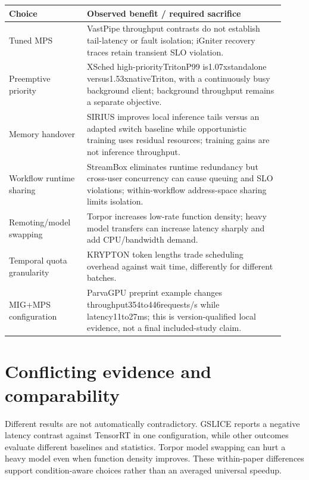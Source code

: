 {\small\begin{longtable}{>{\raggedright\arraybackslash}p{0.26\linewidth}>{\raggedright\arraybackslash}p{0.66\linewidth}}
\toprule
Choice & Observed benefit /\allowbreak{} required sacrifice\\\midrule
\endhead
Tuned MPS & VastPipe throughput contrasts do not establish tail-latency or fault isolation; iGniter recovery traces retain transient SLO violation.\\
Preemptive priority & XSched high-priorityTritonP99 is1.07xstandalone versus1.53xnativeTriton, with a continuously busy background client; background throughput remains a separate objective.\\
Memory handover & SIRIUS improves local inference tails versus an adapted switch baseline while opportunistic training uses residual resources; training gains are not inference throughput.\\
Workflow runtime sharing & StreamBox eliminates runtime redundancy but cross-user concurrency can cause queuing and SLO violations; within-workflow address-space sharing limits isolation.\\
Remoting/\allowbreak{}model swapping & Torpor increases low-rate function density; heavy model transfers can increase latency sharply and add CPU/\allowbreak{}bandwidth demand.\\
Temporal quota granularity & KRYPTON token lengths trade scheduling overhead against wait time, differently for different batches.\\
MIG+MPS configuration & ParvaGPU preprint example changes throughput354to446requests/\allowbreak{}s while latency11to27ms; this is version-qualified local evidence, not a final included-study claim.\\
\bottomrule
\end{longtable}}


\section{Conflicting evidence and comparability}

Different results are not automatically contradictory. GSLICE reports a negative latency contrast against TensorRT in one configuration, while other outcomes evaluate different baselines and statistics. Torpor model swapping can hurt a heavy model even when function density improves. These within-paper differences support condition-aware choices rather than an averaged universal speedup.


